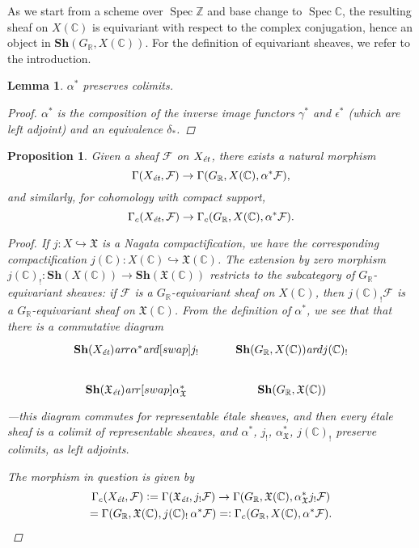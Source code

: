 \documentclass[leqno,12pt]{article}
\theoremstyle{plain}
\newtheorem{lemma}[theorem]{\indent\sc Lemma}
\newtheorem{proposition}[theorem]{\indent\sc Proposition}
\theoremstyle{definition}
\DeclareMathOperator{\Spec}{Spec}
\newcommand{\CC}{\mathbb{C}}
\newcommand{\RR}{\mathbb{R}}
\newcommand{\ZZ}{\mathbb{Z}}
\newcommand{\dfn}{\mathrel{\mathop:}=}
\newcommand{\rdfn}{=\mathrel{\mathop:}}
\newcommand{\ar}{\text{\it ar}}
\newcommand{\et}{\text{\it \'{e}t}}
\begin{document}
As we start from a scheme over $\Spec \ZZ$ and base change to $\Spec \CC$, the
resulting sheaf on $X (\CC)$ is equivariant with respect to the complex
conjugation, hence an object in $\mathbf{Sh} (G_\RR, X (\CC))$. For the
definition of equivariant sheaves, we refer to the introduction.

\begin{lemma}
  \label{lemma:alpha-preserves-colimits}
  $\alpha^*$ preserves colimits.

  \begin{proof}
    $\alpha^*$ is the composition of the inverse image functors $\gamma^*$ and
    $\epsilon^*$ (which are left adjoint) and an equivalence $\delta_*$.
  \end{proof}
\end{lemma}

\begin{proposition}
  \label{prop:inverse-image-gamma}
  Given a sheaf $\mathcal{F}$ on $X_\et$, there exists a natural morphism
  $$\Gamma (X_\et, \mathcal{F}) \to \Gamma (G_\RR, X (\CC), \alpha^* \mathcal{F}),$$
  and similarly, for cohomology with compact support,
  $$\Gamma_c (X_\et, \mathcal{F}) \to \Gamma_c (G_\RR, X (\CC), \alpha^* \mathcal{F}).$$

  \begin{proof}
    If $j\colon X \hookrightarrow \mathfrak{X}$ is a Nagata compactification, we
    have the corresponding compactification
    $j (\CC)\colon X (\CC) \hookrightarrow \mathfrak{X} (\CC)$. The extension by
    zero morphism
    $j (\CC)_!\colon \mathbf{Sh} (X (\CC)) \to \mathbf{Sh} (\mathfrak{X} (\CC))$
    restricts to the subcategory of $G_\RR$-equivariant sheaves: if
    $\mathcal{F}$ is a $G_\RR$-equivariant sheaf on $X (\CC)$, then
    $j (\CC)_!  \mathcal{F}$ is a $G_\RR$-equivariant sheaf on
    $\mathfrak{X} (\CC)$. From the definition of $\alpha^*$, we see that that
    there is a commutative diagram
    \[ \begin{tikzcd}
        \mathbf{Sh} (X_\et) \ar{r}{\alpha^*}\ar{d}[swap]{j_!} & \mathbf{Sh} (G_\RR, X (\CC)) \ar{d}{j (\CC)_!} \\
        \mathbf{Sh} (\mathfrak{X}_\et) \ar{r}[swap]{\alpha^*_\mathfrak{X}} & \mathbf{Sh} (G_\RR, \mathfrak{X} (\CC))
      \end{tikzcd} \]
    ---this diagram commutes for representable \'{e}tale sheaves, and then every
    \'{e}tale sheaf is a colimit of representable sheaves, and $\alpha^*$,
    $j_!$, $\alpha^*_\mathfrak{X}$, $j (\CC)_!$ preserve colimits, as left
    adjoints.

    The morphism in question is given by
    \begin{multline*}
      \Gamma_c (X_\et, \mathcal{F}) \dfn \Gamma (\mathfrak{X}_\et, j_! \mathcal{F}) \to
      \Gamma (G_\RR, \mathfrak{X} (\CC), \alpha^*_\mathfrak{X} j_! \mathcal{F}) \\
      =
      \Gamma (G_\RR, \mathfrak{X} (\CC), j (\CC)_! \, \alpha^* \mathcal{F})
      \rdfn \Gamma_c (G_\RR, X (\CC), \alpha^* \mathcal{F}). \qedhere
    \end{multline*}
  \end{proof}
\end{proposition}
\end{document}
